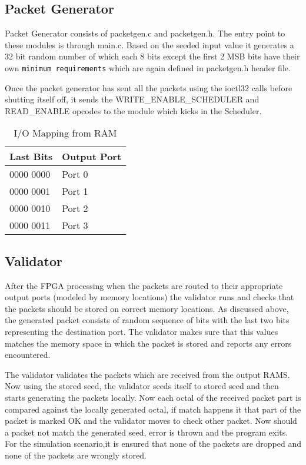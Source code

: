 \documentclass[twoside,12pt,fleqn]{book} %
\begin{document}
\subsection{Packet Generator}
Packet Generator consists of packetgen.c and packetgen.h. The entry point to these modules is through main.c. Based on the seeded input value it generates a 32 bit random number of which each 8 bits except the first 2 MSB bits have their own \texttt{minimum requirements} which are again defined in packetgen.h header file.
\par\vspace{\baselineskip}
Once the packet generator has sent all the packets using the ioctl32 calls before shutting itself off, it sends the WRITE\_ENABLE\_SCHEDULER and READ\_ENABLE opcodes to the module which kicks in the Scheduler.
\begin{table}[ht!]
\begin{center}
    \begin{tabular}{| l | l |}
    \hline
    Last Bits & Output Port \\ \hline
    0000 0000 & Port 0 \\ \hline
    0000 0001 & Port 1 \\ \hline
    0000 0010 & Port 2 \\ \hline
    0000 0011 & Port 3\\ \hline
    \end{tabular}
    \caption{I/O Mapping from RAM}
	\label{table:io_mapping}
\end{center}
\end{table}
\subsection{Validator}
After the FPGA processing when the packets are routed to their appropriate output ports (modeled by memory locations) the validator runs and checks that the packets should be stored on correct memory locations. As discussed above, the generated packet consists of random sequence of bits with the last two bits representing the destination port. The validator makes sure that this values matches the memory space in which the packet is stored and reports any errors encountered.
\par\vspace{\baselineskip}
The validator validates the packets which are received from the output RAMS. Now using the stored seed, the validator seeds itself to stored seed and then starts generating the packets locally. Now each octal of the received packet part is compared against the locally generated octal, if match happens it that part of the packet is marked OK and the validator moves to check other packet. Now should a packet not match the generated seed, error is thrown and the program exits. For the simulation scenario,it is ensured that none of the packets are dropped and none of the packets are wrongly stored.
\end{document}
